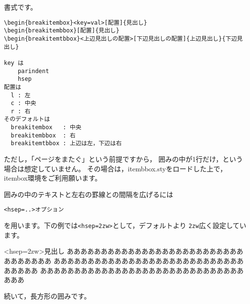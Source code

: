 \documentclass{jarticle}
\begin{document}
書式です。

\begin{boxnote}
\begin{verbatim}
\begin{breakitembox}<key=val>[配置]{見出し}
\begin{breakitembbox}[配置]{見出し}
\begin{breakitemtbbox}<上辺見出しの配置>[下辺見出しの配置]{上辺見出し}{下辺見出し}

key は
    parindent
    hsep
配置は
  l : 左
  c : 中央
  r : 右
そのデフォルトは
  breakitembox   : 中央
  breakitembbox  : 右
  breakitemtbbox : 上辺は左，下辺は右
\end{verbatim}
\end{boxnote}

ただし，「ページをまたぐ」という前提ですから，
囲みの中が1行だけ，という場合は想定していません。
その場合は，\textsf{itembbox.sty}をロードした上で，
\textsf{itembox}環境をご利用願います。
\bigskip

囲みの中のテキストと左右の罫線との間隔を広げるには
\begin{jquote}
\begin{verbatim}
<hsep=..>オプション
\end{verbatim}
\end{jquote}
を用います。下の例では\verb+<hsep=2zw>+として，デフォルトより
\verb+2zw+広く設定しています。

\begin{breakitembox}<hsep=2zw>{見出し}
あああああああああああああああああああああああああああああああああ
あああああああああああああああああああああああああああああああああ
あああああああああああああああああああああああああああああああああ
\end{breakitembox}
\clearpage

続いて，長方形の囲みです。
\end{document}

